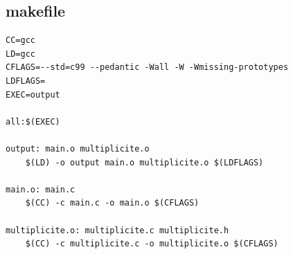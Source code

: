 \documentclass[a4paper, 11pt, oneside]{article}
\begin{document}
\subsection{makefile}

\begin{lstlisting}[caption={makefile}]
CC=gcc
LD=gcc
CFLAGS=--std=c99 --pedantic -Wall -W -Wmissing-prototypes
LDFLAGS=
EXEC=output

all:$(EXEC)

output: main.o multiplicite.o
	$(LD) -o output main.o multiplicite.o $(LDFLAGS)

main.o: main.c
	$(CC) -c main.c -o main.o $(CFLAGS)

multiplicite.o: multiplicite.c multiplicite.h
	$(CC) -c multiplicite.c -o multiplicite.o $(CFLAGS)
\end{lstlisting}
\end{document}
